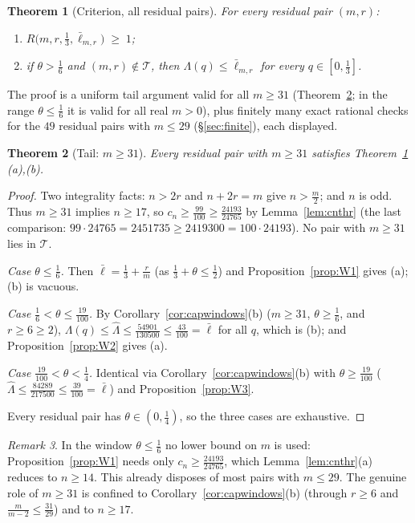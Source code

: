 \documentclass[11pt]{article}
\newtheorem{theorem}{Theorem}[section]
\theoremstyle{remark}
\newtheorem{remark}[theorem]{Remark}
\theoremstyle{plain}
\theoremstyle{plain}
\newcommand{\lbar}{\bar\ell}
\newcommand{\Lhat}{\widehat\Lambda}
\begin{document}
\begin{theorem}[Criterion, all residual pairs]\label{thm:crit}
For every residual pair $(m,r)$:
\begin{enumerate}[label=\textup{(\alph*)}]
\item $R\bigl(m,r,\tfrac13,\lbar_{m,r}\bigr)\;\ge\;1$;
\item if $\theta>\tfrac16$ and $(m,r)\notin\mathcal T$, then $\Lambda(q)\le\lbar_{m,r}$ for every $q\in[0,\tfrac13]$.
\end{enumerate}
\end{theorem}

The proof is a uniform tail argument valid for all $m\ge31$ (Theorem~\ref{thm:tail}; in the range $\theta\le\tfrac16$ it is valid for all real $m>0$), plus finitely many exact rational checks for the $49$ residual pairs with $m\le29$ (\S\ref{sec:finite}), each displayed.

\begin{theorem}[Tail: $m\ge31$]\label{thm:tail}
Every residual pair with $m\ge31$ satisfies Theorem~\ref{thm:crit}\,(a),(b).
\end{theorem}

\begin{proof}
Two integrality facts: $n>2r$ and $n+2r=m$ give $n>\tfrac m2$; and $n$ is odd.  Thus $m\ge31$ implies $n\ge17$, so $c_n\ge\tfrac{99}{100}\ge\tfrac{24193}{24765}$ by Lemma~\ref{lem:cnthr} (the last comparison: $99\cdot24765=2451735\ge2419300=100\cdot24193$).  No pair with $m\ge31$ lies in $\mathcal T$.

\emph{Case $\theta\le\tfrac16$.}  Then $\lbar=\tfrac13+\tfrac rm$ (as $\tfrac13+\theta\le\tfrac12$) and Proposition~\ref{prop:W1} gives (a); (b) is vacuous.

\emph{Case $\tfrac16<\theta\le\tfrac{19}{100}$.}  By Corollary~\ref{cor:capwindows}(b) ($m\ge31$, $\theta\ge\tfrac16$, and $r\ge6\ge2$), $\Lambda(q)\le\Lhat\le\tfrac{54901}{130500}\le\tfrac{43}{100}=\lbar$ for all $q$, which is (b); and Proposition~\ref{prop:W2} gives (a).

\emph{Case $\tfrac{19}{100}<\theta<\tfrac14$.}  Identical via Corollary~\ref{cor:capwindows}(b) with $\theta\ge\tfrac{19}{100}$ ($\Lhat\le\tfrac{84289}{217500}\le\tfrac{39}{100}=\lbar$) and Proposition~\ref{prop:W3}.

Every residual pair has $\theta\in(0,\tfrac14)$, so the three cases are exhaustive.
\end{proof}

\begin{remark}\label{rmk:realm}
In the window $\theta\le\tfrac16$ no lower bound on $m$ is used: Proposition~\ref{prop:W1} needs only $c_n\ge\tfrac{24193}{24765}$, which Lemma~\ref{lem:cnthr}(a) reduces to $n\ge14$.  This already disposes of most pairs with $m\le29$.  The genuine role of $m\ge31$ is confined to Corollary~\ref{cor:capwindows}(b) (through $r\ge6$ and $\tfrac m{m-2}\le\tfrac{31}{29}$) and to $n\ge17$.
\end{remark}
\end{document}
